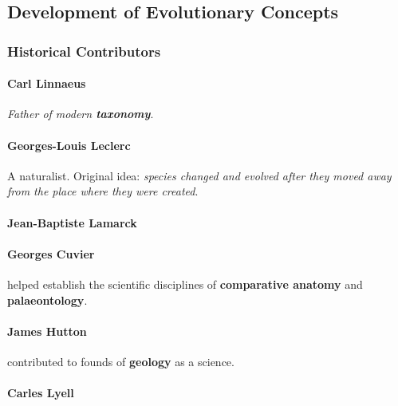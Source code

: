 \documentclass{article}
\begin{document}
	\subsection{Development of Evolutionary Concepts}
	\subsubsection{Historical Contributors}
	\paragraph{Carl Linnaeus} \emph{Father of modern \textbf{taxonomy}}.
	\paragraph{Georges-Louis Leclerc} A naturalist. Original idea: \emph{species changed and evolved after they moved away from the place where they were created}.
	\paragraph{Jean-Baptiste Lamarck}
	\paragraph{Georges Cuvier} helped establish the scientific disciplines of \textbf{comparative anatomy} and \textbf{palaeontology}.
	\paragraph{James Hutton} contributed to founds of \textbf{geology} as a science.
	\paragraph{Carles Lyell} 
\end{document}
